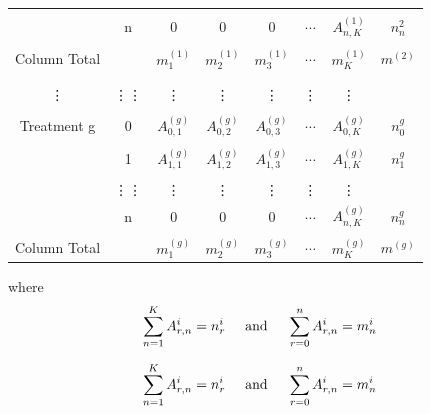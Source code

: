 \documentclass[12pt,oneside]{report}
\theoremstyle{definition}
\theoremstyle{mystyle}
\begin{document}
\begin{table}[h!]
\begin{center}
\begin{tabular}{c c|c c c c c c}
			&&&&&&&\\
			&n & $ 0$  & $ 0$  &$ 0$  & $\cdots$  & $ A_{n,K}^{(1)}$&$n_{n}^{2}$  \\ [1ex]
			&&&&&&&\\
			Column Total	& & $m_{1}^{(1)}$ & $m_{2}^{(1)}$ &$m_{3}^{(1)}$& $\cdots$  & $m_{K}^{(1)}$& $m^{(2)}$\\ [1ex]
			\hline
			&&&&&&&\\
			&&&&&&&\\
			\vdots&\vdots\vdots&\vdots&\vdots&\vdots&\vdots&\vdots&\\
			&&&&&&&\\
			\hline
			Treatment		g&0&$ A_{0,1}^{(g)}$& $A_{0,2}^{(g)}$ &$A_{0,3}^{(g)}$& $\cdots$ &$A_{0,K}^{(g)}$&$n_{0}^{g}$ \\
			&&&&&&&\\
					&1&$ A_{1,1}^{(g)}$& $A_{1,2}^{(g)}$ &$A_{1,3}^{(g)}$& $\cdots$ &$A_{1,K}^{(g)}$&$n_{1}^{g}$ \\
			&&&&&&&\\
			
			&\vdots\vdots&\vdots&\vdots&\vdots&\vdots&\vdots&\\
			&n & $ 0$  & $ 0$  &$ 0$  & $\cdots$  & $ A_{n,K}^{(g)}$&$n_{n}^{g}$  \\ [1ex]
			&&&&&&&\\
			Column Total	& & $m_{1}^{(g)}$ & $m_{2}^{(g)}$ &$m_{3}^{(g)}$& $\cdots$  & $m_{K}^{(g)}$&$m^{(g)}$ \\ [1ex]
			
			\hline
		\end{tabular}
		\label{table:ign}
	\end{center}
\end{table}
where
\begin{equation*}
\sum\limits_{n=1}^{K}A_{r,n}^{i}=n^{i}_{r} \hspace{5mm} \text{and}\hspace{5mm} \sum\limits_{r=0}^{n}A_{r,n}^{i}=m^{i}_{n}
\end{equation*}

\begin{equation*}
\sum\limits_{n=1}^{K}A_{r,n}^{i}=n^{i}_{r} \hspace{5mm} \text{and}\hspace{5mm} \sum\limits_{r=0}^{n}A_{r,n}^{i}=m^{i}_{n}
\end{equation*} 
\end{document}
